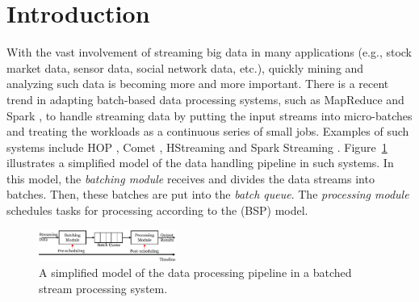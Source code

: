 
\section{Introduction}

With the vast involvement of streaming big data in many applications (e.g.,
stock market data, sensor data, social network data, etc.), quickly mining and
analyzing such data is becoming more and more important. 
There is a recent trend in adapting batch-based data processing systems, such as
MapReduce \cite{Dean2004} and Spark \cite{Zaharia2010C}, to handle streaming
data by putting the input streams into micro-batches and treating the workloads
as a continuous series of small jobs.  Examples of such systems include HOP
\cite{Condie2010}, Comet \cite{He2010}, HStreaming \cite{HStreaming} and Spark
Streaming \cite{Zaharia2013}. 
Figure~\ref{fig:simplemodel} illustrates a simplified model of the data handling
pipeline in such systems. In this model, the \emph{batching module} receives and
divides the data streams into batches. Then, these batches are put into the
\emph{batch queue}. The \emph{processing module} schedules tasks for processing
according to the (BSP) model.  \begin{figure}[htbp] \centering
  \includegraphics[width=0.40\textwidth]{FigureModel} \caption{A simplified
  model of the data processing pipeline in a batched stream processing
system.}\label{fig:simplemodel} \end{figure}

